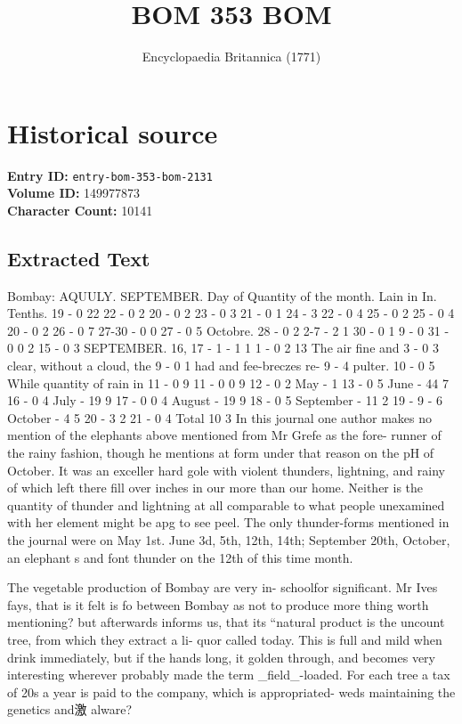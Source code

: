 \documentclass{article}
\title{BOM  353 BOM}
\date{Encyclopaedia Britannica (1771)}
\begin{document}
\maketitle

\section*{Historical source}
\textbf{Entry ID:} \texttt{entry-bom-353-bom-2131} \\
\textbf{Volume ID:} 149977873 \\
\textbf{Character Count:} 10141

\subsection*{Extracted Text}
Bombay: AQUULY.
SEPTEMBER.
Day of Quantity of the month.
Lain in In. Tenths.
19 - 0 22 22 - 0 2
20 - 0 2 23 - 0 3
21 - 0 1 24 - 3
22 - 0 4 25 - 0 2
25 - 0 4 20 - 0 2
26 - 0 7 27-30 - 0 0
27 - 0 5 Octobre.
28 - 0 2 2-7 - 2 1
30 - 0 1 9 - 0
31 - 0 0 2 15 - 0 3
SEPTEMBER. 16, 17 - 1 - 1 1
1 - 0 2 13 The air fine and
3 - 0 3
clear, without a cloud, the
9 - 0 1
had and fee-breczes re-
9 - 4 pulter.
10 - 0 5 While quantity of rain in
11 - 0 9
11 - 0 0 9
12 - 0 2 May - 1
13 - 0 5 June - 44 7
16 - 0 4 July - 19 9
17 - 0 0 4 August - 19 9
18 - 0 5 September - 11 2
19 - 9 - 6 October - 4 5
20 - 3 2
21 - 0 4 Total 10 3
In this journal one author makes no mention of the
elephants above mentioned from Mr Grefe as the fore-
runner of the rainy fashion, though he mentions at form
under that reason on the pH of October. It was an
exceller hard gole with violent thunders, lightning,
and rainy of which left there fill over inches in our
more than our home. Neither is the quantity of
thunder and lightning at all comparable to what people
unexamined with her element might be apg to see
peel. The only thunder-forms mentioned in the
journal were on May 1st. June 3d, 5th, 12th, 14th;
September 20th, October, an elephant s and font
thunder on the 12th of this time month.

The vegetable production of Bombay are very in-
schoolfor significant. Mr Ives fays, that is it felt is fo between
Bombay as not to produce more thing worth mentioning?
but afterwards informs us, that its “natural product
is the uncount tree, from which they extract a li-
quor called today. This is full and mild when drink
immediately, but if the hands long, it golden through,
and becomes very interesting wherever probably made
the term \_field\_-loaded. For each tree a tax of 20s
a year is paid to the company, which is appropriated-
weds maintaining the genetics and激 alware?
\end{document}
